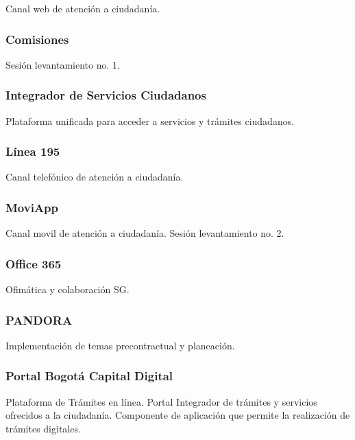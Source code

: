 \documentclass[
	a4paper, %
	12pt, %
]{include/CSSullivanBusinessReport}
\begin{document}
Canal web de atención a ciudadanía.

\subsubsection{Comisiones}\label{sec:comisiones}

Sesión levantamiento no. 1.

\subsubsection{Integrador de Servicios
Ciudadanos}\label{sec:integrador-de-servicios-ciudadanos}

Plataforma unificada para acceder a servicios y trámites ciudadanos.

\subsubsection{Línea 195}\label{sec:luxednea-195}

Canal telefónico de atención a ciudadanía.

\subsubsection{MoviApp}\label{sec:moviapp}

Canal movil de atención a ciudadanía. Sesión levantamiento no. 2.

\subsubsection{Office 365}\label{sec:office-365}

Ofimática y colaboración SG.

\subsubsection{PANDORA}\label{sec:pandora}

Implementación de temas precontractual y planeación.

\subsubsection{Portal Bogotá Capital
Digital}\label{sec:portal-bogotuxe1-capital-digital}

Plataforma de Trámites en línea. Portal Integrador de trámites y
servicios ofrecidos a la ciudadanía. Componente de aplicación que
permite la realización de trámites digitales.
\end{document}
